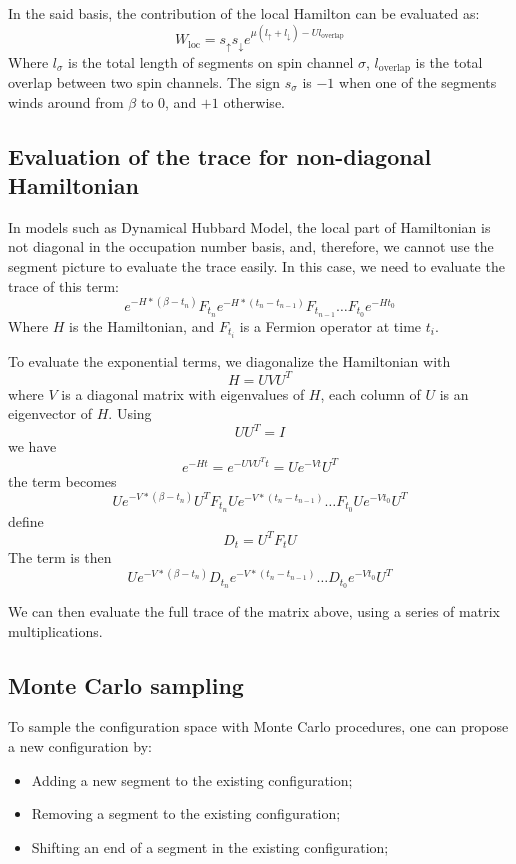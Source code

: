 In the said basis, the contribution of the local Hamilton can be evaluated as:
\begin{equation}
\label{eq:weight_local}
W_{\textrm{loc}} = s_\uparrow s_\downarrow e ^{\mu(l_\uparrow+l_\downarrow)-Ul_{\textrm{overlap}}}
\end{equation}
Where $l_\sigma$ is the total length of segments on spin channel $\sigma$,
$l_{\textrm{overlap}}$ is the total overlap between two spin channels. The sign 
$s_\sigma$ is $-1$ when one of the segments winds around from $\beta$ to $0$, 
and $+1$ otherwise.

\subsection{Evaluation of the trace for non-diagonal Hamiltonian}
\label{sec:trace}
In models such as Dynamical Hubbard Model, the local part of Hamiltonian is not
diagonal in the occupation number basis, and, therefore, we cannot use the segment
picture to evaluate the trace easily. In this case, we need to evaluate the 
trace of this term:
\begin{equation}
  \label{eq:1}
  e^{-H*(\beta-t_n)}F_{t_n}e^{-H*(t_n-t_{n-1})}F_{t_{n-1}}\ldots F_{t_0}e^{-Ht_0}  
\end{equation}
Where $H$ is the Hamiltonian, and $F_{t_{i}}$ is a Fermion operator at time $t_i$.

To evaluate the exponential terms, we diagonalize the Hamiltonian with
\[
H=UVU^T
\]
where $V$ is a diagonal matrix with eigenvalues of $H$, each column of $U$ is an
eigenvector of $H$.
Using
\[
UU^T=I
\]
we have 
\[
e^{-Ht}=e^{-UVU^Tt}=Ue^{-Vt}U^T
\]
 the term becomes
\[
Ue^{-V*(\beta-t_n)}U^TF_{t_n}Ue^{-V*(t_n-t_{n-1})}\ldots F_{t_0}Ue^{-Vt_0}U^T
\]
define 
\[
D_t=U^TF_tU
\]
The term is then
\begin{equation}
  \label{eq:2}
  Ue^{-V*(\beta-t_n)}D_{t_n}e^{-V*(t_n-t_{n-1})}\ldots D_{t_0}e^{-Vt_0}U^T  
\end{equation}

We can then evaluate the full trace of the matrix above, using a series of 
matrix multiplications.


\subsection{Monte Carlo sampling}
\label{sec:cthyb_mcs}
To sample the configuration space with Monte Carlo procedures, one can propose 
a new configuration by:
\begin{itemize}
\item Adding a new segment to the existing configuration;
\item Removing a segment to the existing configuration;
\item Shifting an end of a segment in the existing configuration;
\end{itemize}



